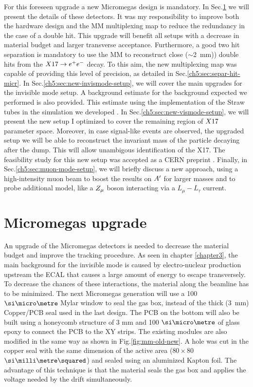 For this foreseen upgrade a new Micromegas design is mandatory. In Sec.\ref{ch5:sec:mm-upgrades} we will present the details of these detectors. It was my responsibility to improve both the hardware design and the MM multiplexing map to reduce the redundancy in the case of a double hit. This upgrade will benefit all setups with a decrease in material budget and larger transverse acceptance. Furthermore, a good two hit separation is mandatory to use the MM to reconstruct close ($\sim$\SI{2}{mm})) double hits from the $X17 \to e^+e^-$ decay. To this aim, the new multiplexing map was capable of providing this level of precision, as detailed in Sec.\ref{ch5:sec:separ-hit-micr}.
In Sec.\ref{ch5:sec:new-invismode-setup}, we will cover the main upgrades for the invisible mode setup. A background estimate for the background expected we performed is also provided. This estimate using the implementation of the Straw tubes in the simulation we developed \cite{pdegen-thesis}. In Sec.\ref{ch5:sec:new-vismode-setup}, we will present the new setup I optimized to cover the remaining region of $X17$ parameter space. Moreover, in case signal-like events are observed, the upgraded setup we will be able to reconstruct the invariant mass of the particle decaying after the dump. This will allow unambigous identification of the X17.
The feasibility study for this new setup was accepted as a CERN preprint \cite{Depero:2020zfy}. Finally, in Sec.\ref{ch5:sec:muon-mode-setup}, we will briefly discuss a new approach, using a high-intensity muon beam to boost the results on $A'$ for larger masses and to probe additional model, like a $Z_{\mu}$ boson interacting via a $L_{\mu} - L_{\tau}$ current.

\section{Micromegas upgrade}
\label{ch5:sec:mm-upgrades}

An upgrade of the Micromegas detectors is needed to decrease the material budget and improve the tracking procedure. As seen in chapter \ref{chapter3}, the main background for the invisible mode is caused by electro-nuclear production upstream the ECAL that causes a large amount of energy to escape transversely. To decrease the chances of these interactions, the material along the beamline has to be minimized. The next Micromegas generation will use a 100 $\mum$ Mylar window to seal the gas box, instead of the thick (\SI{3}{mm})
Copper/PCB seal used in the last design. The PCB on the bottom will also be built using a honeycomb structure of 3 mm and 100 $\mum$ of glass epoxy to connect the PCB to the XY strips. The existing modules are also modified in the same way as shown in Fig.\ref{fig:mm-old-new}. A hole was cut in the copper seal with the same dimension of the active area ($80 \times 80$ $\mms$) and sealed using an aluminized Kapton foil. The advantage of this technique is that the material seals the gas box and applies the voltage needed by the drift simultaneously.

